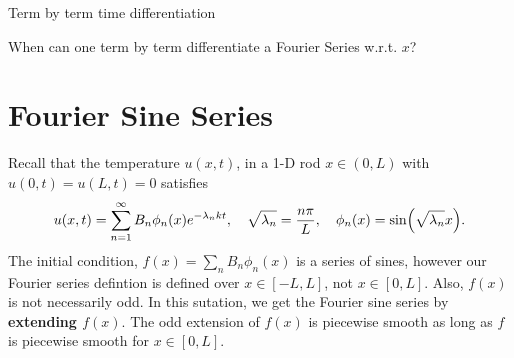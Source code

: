 Term by term time differentiation

When can one term by term differentiate a Fourier Series w.r.t. $x$? 


\section{Fourier Sine Series}

Recall that the temperature $u(x,t)$, in a 1-D rod $x\in(0,L)$ with $u(0,t)=u(L,t)=0$ satisfies 
\[ u(x,t) = \sum\limits_{n=1}^\infty B_n \phi_n(x) e^{-\lambda_n kt},
	\quad \sqrt{\lambda_n} = \frac{n\pi}{L} , 
	\quad \phi_n(x) = \sin(\sqrt{\lambda_n} x). \]
The initial condition, $f(x) = \sum_{n} B_n \phi_n(x)$ is a series of sines, however our Fourier series defintion is defined over $x\in[-L, L]$, not $x\in[0, L]$. Also, $f(x)$ is not necessarily odd. In this sutation, we get the Fourier sine series by \textbf{extending  $f(x)$}. The odd extension of $f(x)$ is piecewise smooth as long as $f$ is piecewise smooth for $x\in[0, L]$. 

